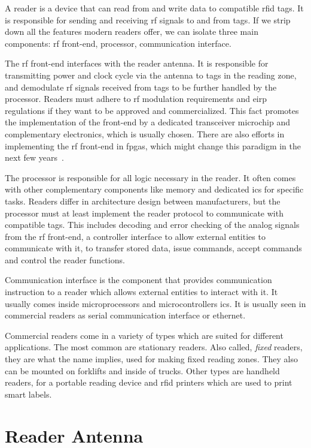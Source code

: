 A reader is a device that can read from and write data to compatible \ac{rfid} tags. It is responsible for sending and receiving \ac{rf} signals to and from tags.
If we strip down all the features modern readers offer, we can isolate three main components: \ac{rf} front-end, processor, communication interface. %

The \ac{rf} front-end interfaces with the reader antenna. 
It is responsible for transmitting power and clock cycle via the antenna to tags in the reading zone, and demodulate \ac{rf} signals received from tags to be further handled by the processor. 
Readers must adhere to \ac{rf} modulation requirements and \ac{eirp} regulations if they want to be approved and commercialized. This fact promotes the implementation of the front-end by a dedicated transceiver microchip and complementary electronics, which is usually chosen. There are also efforts in implementing the \ac{rf} front-end in \acp{fpga}, which might change this paradigm in the next few years~\cite{hugomanueloliveirademirandaSistemasRFIDUHF2015}.

The processor is responsible for all logic necessary in the reader. It often comes with other complementary components like memory and dedicated \acp{ic} for specific tasks. Readers differ in architecture design between manufacturers, but the processor must at least implement the reader protocol to communicate with compatible tags. This includes decoding and error checking of the analog signals from the \ac{rf} front-end, a controller interface to allow external entities to communicate with it, to transfer stored data, issue commands, accept commands and control the reader functions.

Communication interface is the component that provides communication instruction to a reader which allows external entities to interact with it.
It usually comes inside microprocessors and microcontrollers \acp{ic}. It is usually seen in commercial readers as serial communication interface or ethernet.

Commercial readers come in a variety of types which are suited for different applications.
The most common are stationary readers. Also called, \emph{fixed} readers, they are what the name implies, used for making fixed reading zones. They also can be mounted on forklifts and inside of trucks.
Other types are handheld readers, for a portable reading device and \ac{rfid} printers which are used to print smart labels.

\section{Reader Antenna} \label{sec:antenna}


